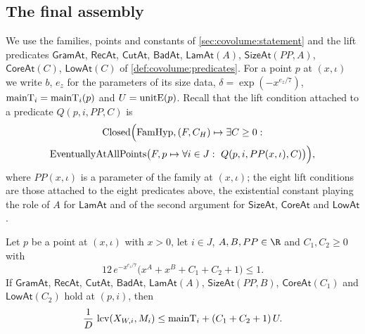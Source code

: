 \subsection{The final assembly}\label{sec:pf:covol:assembly}

We use the families, points and constants of \cref{sec:covolume:statement} and the lift predicates
$\mathsf{GramAt}$, $\mathsf{RecAt}$, $\mathsf{CutAt}$, $\mathsf{BadAt}$, $\mathsf{LamAt}(A)$,
$\mathsf{SizeAt}(PP,A)$, $\mathsf{CoreAt}(C)$, $\mathsf{LowAt}(C)$ of \cref{def:covolume:predicates}. For a
point $p$ at $(x,\iota)$ we write $b$, $e_z$ for the parameters of its size data,
$\delta=\exp(-x^{e_z/7})$, $\mathrm{mainT}_i=\mathrm{mainT}_i(p)$ and $U=\mathrm{unitE}(p)$. Recall that the lift
condition attached to a predicate $Q(p,i,PP,C)$ is
\begin{multline*}
\mathrm{Closed}\Bigl(\mathrm{FamHyp},(F,C_H)\mapsto\exists C\ge0:\\
\mathrm{EventuallyAtAllPoints}\bigl(F,p\mapsto\forall i\in J:\ Q(p,i,PP(x,\iota),C)\bigr)\Bigr),
\end{multline*}
where $PP(x,\iota)$ is a parameter of the family at $(x,\iota)$; the eight lift conditions are those
attached to the eight predicates above, the existential constant playing the role of $A$ for
$\mathsf{LamAt}$ and of the second argument for $\mathsf{SizeAt}$, $\mathsf{CoreAt}$ and $\mathsf{LowAt}$.

\begin{lemma}\label{pf:covol:lem:lcvle}
Let $p$ be a point at $(x,\iota)$ with $x>0$, let $i\in J$, $A,B,PP\in\R$ and $C_1,C_2\ge0$ with
\begin{equation}\label{pf:covol:eq:loss}
12\,e^{-x^{e_z/7}}\bigl(x^A+x^B+C_1+C_2+1\bigr)\le1 .
\end{equation}
If $\mathsf{GramAt}$, $\mathsf{RecAt}$, $\mathsf{CutAt}$, $\mathsf{BadAt}$, $\mathsf{LamAt}(A)$,
$\mathsf{SizeAt}(PP,B)$, $\mathsf{CoreAt}(C_1)$ and $\mathsf{LowAt}(C_2)$ hold at $(p,i)$, then
\[
\frac1D\,\operatorname{lcv}(X_{W,i},M_i)\le\mathrm{mainT}_i+(C_1+C_2+1)\,U .
\]
\end{lemma}

